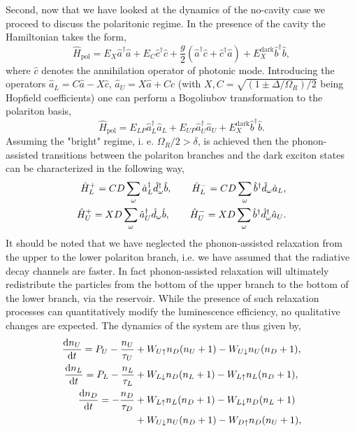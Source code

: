 \documentclass[journal=aamick,manuscript=article]{achemso}
\begin{document}
Second, now that we have looked at the dynamics of the no-cavity case we proceed to discuss the polaritonic regime. In the presence of the cavity the Hamiltonian takes the form,
%
\begin{equation}
\hat{H}_{\mathrm{pol}} = E_X \hat{a}^\dagger \hat{a} +E_C \hat{c}^\dagger \hat{c} +\frac{g}{2} (\hat{a}^\dagger \hat{c} +\hat{c}^\dagger \hat{a})  +E_X^{\mathrm{dark}} \hat{b}^\dagger \hat{b}, 
\end{equation}
%
where $\hat{c}$ denotes the annihilation operator of photonic mode. Introducing the operators $\hat{a}_L=C\hat{a}-X\hat{c}$,
$\hat{a}_U=X\hat{a}+C\hat{c}$ (with $X,C= \sqrt{(1\pm\Delta/\Omega_R)/2}$ being Hopfield coefficients) one can perform a Bogoliubov transformation to the polariton basis,
%
\begin{equation}
\hat{H}_{\mathrm{pol}} = E_{LP} \hat{a}_L^\dagger \hat{a}_L +E_{UP} \hat{a}_U^\dagger \hat{a}_U +E_X^{\mathrm{dark}} \hat{b}^\dagger \hat{b}.
\end{equation}
%
Assuming the "bright" regime, i. e. $\Omega_R/2>\delta$, is achieved then the phonon-assisted transitions between the polariton branches and the dark exciton states can be characterized in the following way,
%
\begin{align}
\hat{H}_L^+ = C D \sum_{\omega} \hat{a}_L^\dagger \hat{d}_{\omega}^\dagger \hat{b}, \qquad \hat{H}^-_L = C D \sum_{\omega} \hat{b}^\dagger \hat{d}_{\omega} \hat{a}_L, \notag \\
\hat{H}_U^+ = X D \sum_{\omega} \hat{a}_U^\dagger \hat{d}_{\omega} \hat{b}, \qquad \hat{H}^-_U = X D \sum_{\omega} \hat{b}^\dagger \hat{d}_{\omega}^\dagger \hat{a}_U. 
\end{align}
%
It should be noted that we have neglected the phonon-assisted relaxation from the upper to the lower polariton branch, i.e. we have assumed that the radiative decay channels are faster. In fact phonon-assisted relaxation will ultimately redistribute the particles from the bottom of the upper branch to the bottom of the lower branch, via the reservoir. While the presence of such relaxation processes can quantitatively modify the luminescence efficiency, no qualitative changes are expected. The dynamics of the system are thus given by,
%
\begin{align}
\label{pol-diff-eq}
\frac{\mathrm{d} n_U}{\mathrm{d} t} =P_U -\frac{n_U}{\tau_U} &+W_{U\uparrow} n_D(n_U+1) -W_{U\downarrow} n_U(n_D+1), \notag \\
\frac{\mathrm{d} n_L}{\mathrm{d} t} =P_L -\frac{n_L}{\tau_L} &+W_{L\downarrow} n_D(n_L+1) -W_{L\uparrow} n_L(n_D+1), \notag \\
\frac{\mathrm{d} n_D}{\mathrm{d} t} = -\frac{n_D}{\tau_D} &+W_{L\uparrow} n_L(n_D+1) -W_{L\downarrow} n_D(n_L+1) \notag \\
&+W_{U\downarrow} n_U(n_D+1) -W_{D\uparrow} n_D(n_U+1), 
\end{align}
\end{document}
